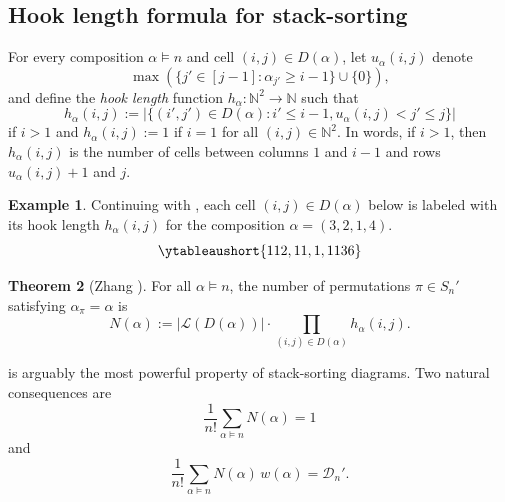 \documentclass[12pt]{amsart}
\theoremstyle{definition}
\newtheorem{theorem}{Theorem}[section]
\newtheorem{example}[theorem]{Example}
\begin{document}
\subsection*{Hook length formula for stack-sorting}
For every composition $\alpha\models n$ and cell $(i,j)\in D(\alpha)$, let $u_{\alpha}(i,j)$ denote \[\max(\{j'\in [j-1]: \alpha_{j'}\ge i-1\}\cup \{0\}),\] and define the \emph{hook length} function $h_\alpha: \mathbb{N}^2\to \mathbb{N}$ such that
\[h_\alpha(i,j) := \bigl|\{(i',j')\in D(\alpha):i'\le i-1, u_{\alpha}(i,j)<j'\le j\}\bigr|\]
if $i>1$ and $h_{\alpha}(i,j):= 1$ if $i=1$ for all $(i,j)\in\mathbb{N}^2$. In words, if $i>1$, then $h_{\alpha}(i,j)$ is the number of cells between columns $1$ and $i-1$ and rows $u_{\alpha}(i,j) + 1$ and $j$.
\begin{example}
Continuing with , each cell $(i,j)\in D(\alpha)$ below is labeled with its hook length $h_\alpha(i,j)$ for the composition $\alpha=(3,2,1,4)$.
\[\ytableaushort{{1}{1}{2},{1}{1},{1},{1}{1}{3}{6}}\]
\end{example}
\begin{theorem}[Zhang {\cite[Corollary~4.11]{zhang26}}]\label{thm:hook_count}
For all $\alpha\models n$, the number of permutations $\pi\in S_n'$ satisfying $\alpha_{\pi}=\alpha$ is
\[N(\alpha):=|\mathcal{L}(D(\alpha))|\cdot\prod_{(i,j)\in D(\alpha)}h_\alpha(i,j).\]
\end{theorem}

 is arguably the most powerful property of stack-sorting diagrams. Two natural consequences are 
\[\frac{1}{n!}\sum_{\alpha\models n}N(\alpha) = 1\]
and
\[\frac{1}{n!}\sum_{\alpha\models n}N(\alpha)\,w(\alpha) = \mathcal{D}_{n}'.\]
\end{document}
